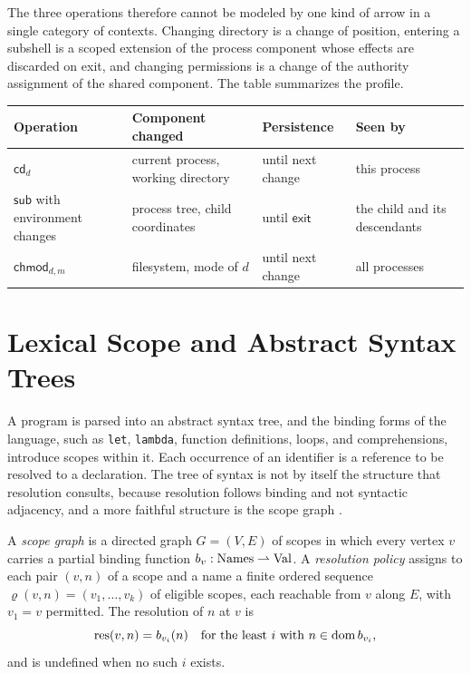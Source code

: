 The three operations therefore cannot be modeled by one kind of arrow in a single category of contexts. Changing directory is a change of position, entering a subshell is a scoped extension of the process component whose effects are discarded on exit, and changing permissions is a change of the authority assignment of the shared component. The table summarizes the profile.

\begin{center}
\begin{tabular}{p{}p{}p{}p{}}
\toprule
Operation & Component changed & Persistence & Seen by\\
\midrule
$\mathsf{cd}_d$ & current process, working directory & until next change & this process\\
$\mathsf{sub}$ with environment changes & process tree, child coordinates & until $\mathsf{exit}$ & the child and its descendants\\
$\mathsf{chmod}_{d,m}$ & filesystem, mode of $d$ & until next change & all processes\\
\bottomrule
\end{tabular}
\end{center}

\section{Lexical Scope and Abstract Syntax Trees}

A program is parsed into an abstract syntax tree, and the binding forms of the language, such as \texttt{let}, \texttt{lambda}, function definitions, loops, and comprehensions, introduce scopes within it. Each occurrence of an identifier is a reference to be resolved to a declaration. The tree of syntax is not by itself the structure that resolution consults, because resolution follows binding and not syntactic adjacency, and a more faithful structure is the scope graph \cite{scopegraphs}.

\begin{definition}\label{def:scopegraph}
A \emph{scope graph} is a directed graph $G=(V,E)$ of scopes in which every vertex $v$ carries a partial binding function $b_v:\mathrm{Names}\rightharpoonup\mathrm{Val}$. A \emph{resolution policy} assigns to each pair $(v,n)$ of a scope and a name a finite ordered sequence $\varrho(v,n)=(v_1,\dots,v_k)$ of eligible scopes, each reachable from $v$ along $E$, with $v_1=v$ permitted. The resolution of $n$ at $v$ is
\[
\operatorname{res}(v,n)=b_{v_i}(n)\quad\text{for the least }i\text{ with }n\in\operatorname{dom} b_{v_i},
\]
and is undefined when no such $i$ exists.
\end{definition}

